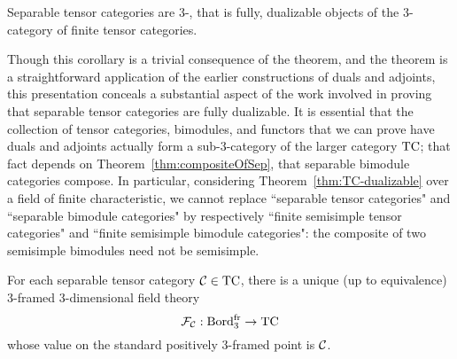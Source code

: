\documentclass{amsart}
\begin{document}
\begin{corollary} \label{cor:septcisdualizable}
Separable tensor categories are 3-, that is fully, dualizable objects of the 3-category of finite tensor categories.
\end{corollary}

\begin{remark}
Though this corollary is a trivial consequence of the theorem, and the theorem is a straightforward application of the earlier constructions of duals and adjoints, this presentation conceals a substantial aspect of the work involved in proving that separable tensor categories are fully dualizable.  It is essential that the collection of tensor categories, bimodules, and functors that we can prove have duals and adjoints actually form a sub-3-category of the larger category $\mathrm{TC}$; that fact depends on Theorem~\ref{thm:compositeOfSep}, that separable bimodule categories compose.  In particular, considering Theorem~\ref{thm:TC-dualizable} over a field of finite characteristic, we cannot replace ``separable tensor categories" and ``separable bimodule categories" by respectively ``finite semisimple tensor categories" and ``finite semisimple bimodule categories": the composite of two semisimple bimodules need not be semisimple.
\end{remark}

\begin{corollary} \label{cor:3dtft}
For each separable tensor category $\mathcal C \in \mathrm{TC}$, there is a unique (up to equivalence) 3-framed 3-dimensional field theory
\[
\mathcal F_\mathcal C : \mathrm{Bord}^\mathrm{fr}_3 \rightarrow \mathrm{TC}
\]
whose value on the standard positively 3-framed point is $\mathcal C$.
\end{corollary}
\end{document}

